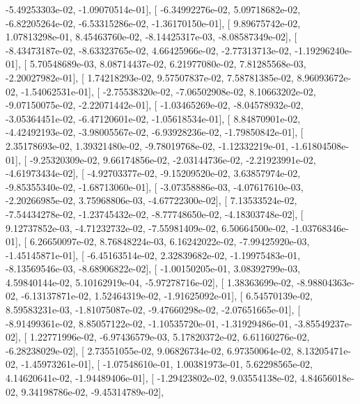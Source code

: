 \documentclass{article}
\begin{document}
         -5.49253303e-02,  -1.09070514e-01],
       [ -6.34992276e-02,   5.09718682e-02,  -6.82205264e-02,
         -6.53315286e-02,  -1.36170150e-01],
       [  9.89675742e-02,   1.07813298e-01,   8.45463760e-02,
         -8.14425317e-03,  -8.08587349e-02],
       [ -8.43473187e-02,  -8.63323765e-02,   4.66425966e-02,
         -2.77313713e-02,  -1.19296240e-01],
       [  5.70548689e-03,   8.08714437e-02,   6.21977080e-02,
          7.81285568e-03,  -2.20027982e-01],
       [  1.74218293e-02,   9.57507837e-02,   7.58781385e-02,
          8.96093672e-02,  -1.54062531e-01],
       [ -2.75538320e-02,  -7.06502908e-02,   8.10663202e-02,
         -9.07150075e-02,  -2.22071442e-01],
       [ -1.03465269e-02,  -8.04578932e-02,  -3.05364451e-02,
         -6.47120601e-02,  -1.05618534e-01],
       [  8.84870901e-02,  -4.42492193e-02,  -3.98005567e-02,
         -6.93928236e-02,  -1.79850842e-01],
       [  2.35178693e-02,   1.39321480e-02,  -9.78019768e-02,
         -1.12332219e-01,  -1.61804508e-01],
       [ -9.25320309e-02,   9.66174856e-02,  -2.03144736e-02,
         -2.21923991e-02,  -4.61973434e-02],
       [ -4.92703377e-02,  -9.15209520e-02,   3.63857974e-02,
         -9.85355340e-02,  -1.68713060e-01],
       [ -3.07358886e-03,  -4.07617610e-03,  -2.20266985e-02,
          3.75968806e-03,  -4.67722300e-02],
       [  7.13533524e-02,  -7.54434278e-02,  -1.23745432e-02,
         -8.77748650e-02,  -4.18303748e-02],
       [  9.12737852e-03,  -4.71232732e-02,  -7.55981409e-02,
          6.50664500e-02,  -1.03768346e-01],
       [  6.26650097e-02,   8.76848224e-03,   6.16242022e-02,
         -7.99425920e-03,  -1.45145871e-01],
       [ -6.45163514e-02,   2.32839682e-02,  -1.19975483e-01,
         -8.13569546e-03,  -8.68906822e-02],
       [ -1.00150205e-01,   3.08392799e-03,   4.59840144e-02,
          5.10162919e-04,  -5.97278716e-02],
       [  1.38363699e-02,  -8.98804363e-02,  -6.13137871e-02,
          1.52464319e-02,  -1.91625092e-01],
       [  6.54570139e-02,   8.59583231e-03,  -1.81075087e-02,
         -9.47660298e-02,  -2.07651665e-01],
       [ -8.91499361e-02,   8.85057122e-02,  -1.10535720e-01,
         -1.31929486e-01,  -3.85549237e-02],
       [  1.22771996e-02,  -6.97436579e-03,   5.17820372e-02,
          6.61160276e-02,  -6.28238029e-02],
       [  2.73551055e-02,   9.06826734e-02,   6.97350064e-02,
          8.13205471e-02,  -1.45973261e-01],
       [ -1.07548610e-01,   1.00381973e-01,   5.62298565e-02,
          4.14620641e-02,  -1.94489406e-01],
       [ -1.29423802e-02,   9.03554138e-02,   4.84656018e-02,
          9.34198786e-02,  -9.45314789e-02],
\end{document}
